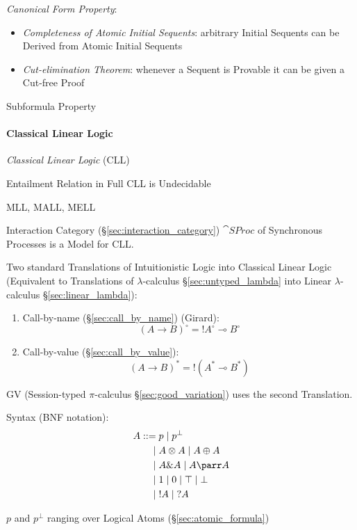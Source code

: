 \emph{Canonical Form Property}:
\begin{itemize}
  \item \emph{Completeness of Atomic Initial Sequents}: arbitrary
    Initial Sequents can be Derived from Atomic Initial Sequents
  \item \emph{Cut-elimination Theorem}: whenever a Sequent is Provable
    it can be given a Cut-free Proof
\end{itemize}

Subformula Property



\paragraph{Classical Linear Logic}\label{sec:cll} \hfill

\emph{Classical Linear Logic} (CLL)

Entailment Relation in Full CLL is Undecidable

MLL, MALL, MELL

Interaction Category (\S\ref{sec:interaction_category}) $\cat{SProc}$
of Synchronous Processes is a Model for CLL.

Two standard Translations of Intuitionistic Logic into Classical
Linear Logic (Equivalent to Translations of $\lambda$-calculus
\S\ref{sec:untyped_lambda} into Linear
$\lambda$-calculus \S\ref{sec:linear_lambda}):\cite{wadler12}
\begin{enumerate}
  \item Call-by-name (\S\ref{sec:call_by_name}) (Girard):
\[
  (A \rightarrow B)^\circ = !A^\circ \multimap B^\circ
\]
  \item Call-by-value (\S\ref{sec:call_by_value}):
\[
  (A \rightarrow B)^* = !(A^* \multimap B^*)
\]
\end{enumerate}
GV (Session-typed $\pi$-calculus \S\ref{sec:good_variation}) uses the
second Translation.

Syntax (BNF notation):
\[
\begin{split}
  A ::=& \; p \; | \; p^\bot\\
      |& \; A \otimes A \; | \; A \oplus A\\
      |& \; A \& A \; | \; A \parr A\\
      |& \; 1 \; | \; 0 \; | \; \top \; | \; \bot\\
      |& \; !A \; | \; ?A
\end{split}
\]

$p$ and $p^\bot$ ranging over Logical Atoms
(\S\ref{sec:atomic_formula})

